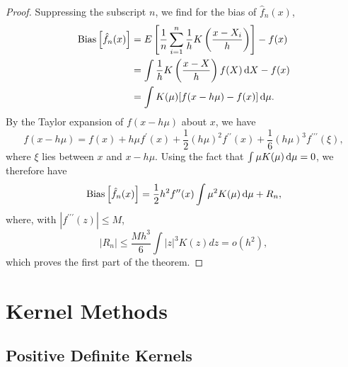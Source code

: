 \begin{proof}
	Suppressing the subscript \(n\), we find for the bias of \(\hat{f}_{n}(x)\),
	\begin{equation*}
		\begin{aligned}
			\mathrm{Bias}\left[\hat{f}_{n}(x)\right] & =E\left[\frac{1}{n}\sum_{i=1}^{n}\frac{1}{h}K\left(\frac{x-X_i}{h}\right)\right]-f(x) \\
			                                 & =\int\frac{1}{h}K\left(\frac{x-X}{h}\right)f(X)\mathop{}\!\mathrm{d} X-f(x)                            \\
			                                 & =\int K(\mu)[f(x-h\mu)-f(x)]\mathop{}\!\mathrm{d}\mu.
		\end{aligned}
	\end{equation*}
	By the Taylor expansion of \(f(x-h\mu)\) about \(x\), we have
	\begin{equation*}
		f(x-h\mu)=f(x)+h\mu f^{\prime}(x)+\frac{1}{2}(h\mu)^{2}f^{\prime\prime}(x)+\frac{1}{6}(h\mu)^{3}f^{\prime\prime\prime}(\xi),
	\end{equation*}
	where \(\xi\) lies between \(x\) and \(x-h\mu\). Using the fact that \(\int\mu K(\mu)\mathop{}\!\mathrm{d}\mu=0\), we therefore have
	\begin{equation*}
		\mathrm{Bias}\left[\hat{f}_{n}(x)\right]=\frac{1}{2}h^{2}f^{\prime\prime}(x)\int\mu^{2}K(\mu)\mathop{}\!\mathrm{d}\mu+R_{n},
	\end{equation*}
	where, with \(\left|f^{\prime \prime \prime}(z)\right| \leq M\),
	\begin{equation*}
		\left|R_{n}\right| \leq \frac{M h^3}{6} \int|z|^3 K(z) d z=o\left(h^2\right),
	\end{equation*}
	which proves the first part of the theorem.
\end{proof}

\section{Kernel Methods}

\subsection{Positive Definite Kernels}

